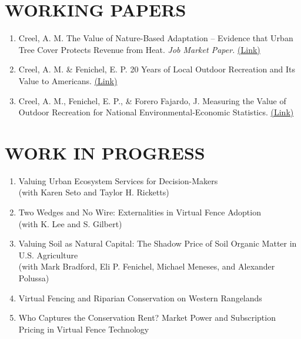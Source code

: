 \documentclass[11pt]{article}
\begin{document}
\section*{WORKING PAPERS}
\begin{enumerate}[left=0pt]
    \item Creel, A. M. The Value of Nature-Based Adaptation -- Evidence that Urban Tree Cover Protects Revenue from Heat. \textit{Job Market Paper.} \href{https://a5creel.github.io/working_papers/creel_jmp.pdf}{(Link)}
    \item Creel, A. M. \& Fenichel, E. P. 20 Years of Local Outdoor Recreation and Its Value to Americans. \href{https://a5creel.github.io/working_papers/creel_local_recreation.pdf}{(Link)}
    \item Creel, A. M., Fenichel, E. P., \& Forero Fajardo, J. Measuring the Value of Outdoor Recreation for National Environmental-Economic Statistics. \href{https://a5creel.github.io/working_papers/simple_pdfs/creel_sat_accnt.pdf}{(Link)}
\end{enumerate}

\section*{WORK IN PROGRESS}
\begin{enumerate}[left=0pt]
    \item Valuing Urban Ecosystem Services for Decision-Makers \\(with Karen Seto and Taylor H. Ricketts)
    \item Two Wedges and No Wire: Externalities in Virtual Fence Adoption \\(with K. Lee and S. Gilbert)
    \item Valuing Soil as Natural Capital: The Shadow Price of Soil Organic Matter in U.S. Agriculture \\(with Mark Bradford, Eli P. Fenichel, Michael Meneses, and Alexander Polussa)
    \item Virtual Fencing and Riparian Conservation on Western Rangelands  %
    \item Who Captures the Conservation Rent? Market Power and Subscription Pricing in Virtual Fence Technology
\end{enumerate}
\end{document}
